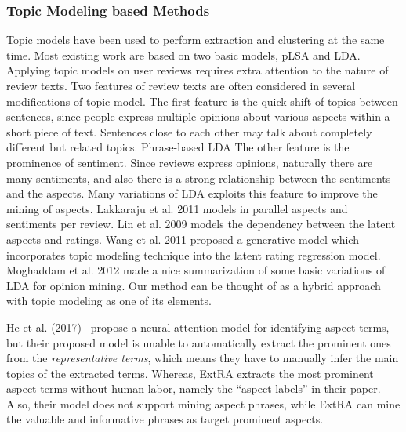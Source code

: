 \subsubsection{Topic Modeling based Methods}
Topic models have been used to perform extraction and clustering 
at the same time. Most existing work are based on two basic models, 
pLSA\cite{hofmann1999probabilistic} and LDA\cite{blei2003latent}. 
Applying topic models on user reviews requires extra attention to
the nature of review texts. Two features of review texts are often considered 
in several modifications of topic model. The first feature is the 
quick shift of topics between sentences, since people express 
multiple opinions about various aspects within a short piece of text. 
Sentences close to each other may talk about completely different but 
related topics. Phrase-based LDA The other feature is the prominence of 
sentiment. Since reviews express opinions, naturally there are 
many sentiments, and also there is a strong relationship between the 
sentiments and the aspects. Many variations of LDA exploits this 
feature to improve the mining of aspects.
Lakkaraju et al. 2011 \cite{lakkaraju2011exploiting} models in 
parallel aspects and sentiments per review. 
Lin et al. 2009 \cite{lin2009joint} models the dependency between 
the latent aspects and ratings. Wang et al. 2011\cite{wang2011latent} proposed 
a generative model which incorporates topic modeling technique 
into the latent rating regression model\cite{wang2010latent}.
Moghaddam et al. 2012 \cite{moghaddam2012design} made a nice 
summarization of some basic variations of LDA for opinion mining.
Our method can be thought of as a hybrid approach with topic modeling as
one of its elements.

He et al. (2017)~\cite{DBLP:conf/acl/HeLND17}  propose a neural attention model for identifying aspect terms, but their proposed model is unable to automatically extract the prominent ones from the \textit{representative terms}, which means they have to manually infer the main topics of the extracted terms.
Whereas, ExtRA extracts the most prominent aspect terms without human labor, namely the ``aspect labels'' in their paper.  
Also, their model does not support mining aspect phrases, while ExtRA can mine the valuable and informative phrases as target prominent aspects. 

